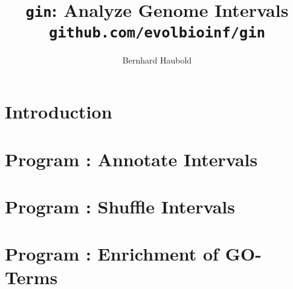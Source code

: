 \documentclass[a4paper]{report}
\begin{document}
\pagestyle{noweb}

\title{\texttt{gin}: Analyze Genome Intervals\\
\small\texttt{github.com/evolbioinf/gin}}
\author{Bernhard Haubold}
\maketitle
\tableofcontents

\chapter{Introduction}

\chapter{Program : Annotate Intervals}\label{ch:an}

\chapter{Program : Shuffle Intervals}\label{ch:sh}

\chapter{Program : Enrichment of GO-Terms}\label{ch:eg}


\end{document}
